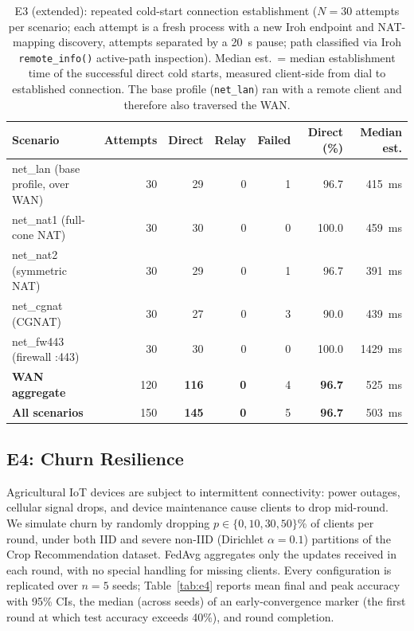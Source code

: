 \documentclass[a4paper,fleqn]{cas-dc}
\begin{document}
\begin{table}[t]
\centering
\caption{E3 (extended): repeated cold-start connection establishment ($N{=}30$ attempts per scenario; each attempt is a fresh process with a new Iroh endpoint and NAT-mapping discovery, attempts separated by a 20~s pause; path classified via Iroh \texttt{remote\_info()} active-path inspection). Median est.\ = median establishment time of the successful direct cold starts, measured client-side from dial to established connection. The base profile (\texttt{net\_lan}) ran with a remote client and therefore also traversed the WAN.}
\label{tab:e3est}
\footnotesize
\begin{tabular}{l r r r r r r}
\toprule
\textbf{Scenario} & \textbf{Attempts} & \textbf{Direct} & \textbf{Relay} & \textbf{Failed} & \textbf{Direct (\%)} & \textbf{Median est.} \\
\midrule
net\_lan   (base profile, over WAN) & 30  & 29  & 0 & 1 & 96.7  & 415~ms  \\
net\_nat1  (full-cone NAT)  & 30  & 30  & 0 & 0 & 100.0 & 459~ms  \\
net\_nat2  (symmetric NAT)  & 30  & 29  & 0 & 1 & 96.7  & 391~ms  \\
net\_cgnat (CGNAT)          & 30  & 27  & 0 & 3 & 90.0  & 439~ms  \\
net\_fw443 (firewall :443)  & 30  & 30  & 0 & 0 & 100.0 & 1429~ms \\
\midrule
\textbf{WAN aggregate}      & 120 & \textbf{116} & \textbf{0} & 4 & \textbf{96.7} & 525~ms \\
\textbf{All scenarios}      & 150 & \textbf{145} & \textbf{0} & 5 & \textbf{96.7} & 503~ms \\
\bottomrule
\end{tabular}
\end{table}

\subsection{E4: Churn Resilience}
\label{sec:e4}

Agricultural IoT devices are subject to intermittent connectivity: power outages, cellular signal drops, and device maintenance cause clients to drop mid-round. We simulate churn by randomly dropping $p \in \{0, 10, 30, 50\}$\% of clients per round, under both IID and severe non-IID (Dirichlet $\alpha{=}0.1$) partitions of the Crop Recommendation dataset. FedAvg aggregates only the updates received in each round, with no special handling for missing clients. Every configuration is replicated over $n{=}5$ seeds; Table~\ref{tab:e4} reports mean final and peak accuracy with 95\% CIs, the median (across seeds) of an early-convergence marker (the first round at which test accuracy exceeds 40\%), and round completion.
\end{document}
